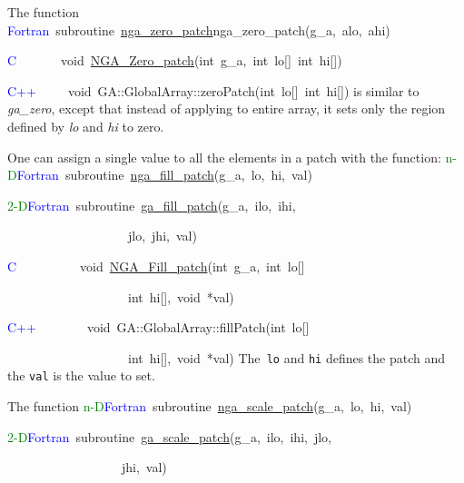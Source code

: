 The function
\textcolor{blue}{Fortran}~subroutine~\href{http://www.emsl.pnl.gov/docs/global/ga_ops.html\#ga_zero_patch}{nga\_{}zero\_{}patch}nga\_zero\_patch(g\_a,~alo,~ahi)~

\textcolor{blue}{C}~~~~~~~void~\href{http://www.emsl.pnl.gov/docs/global/c_nga_ops.html\#ga_zero_patch}{NGA\_{}Zero\_{}patch}(int~g\_a,~int~lo{[}{]}~int~hi{[}{]})~

\textcolor{blue}{C++}~~~~~void~GA::GlobalArray::zeroPatch(int~lo{[}{]}~int~hi{[}{]})
is similar to \emph{ga\_zero}, except that instead of applying to
entire array, it sets only the region defined by \emph{lo} and \emph{hi}
to zero.

One can assign a single value to all the elements in a patch with
the function:
\textcolor{green}{n-D}\textcolor{blue}{Fortran}~subroutine~\href{http://www.emsl.pnl.gov/docs/global/ga_ops.html\#ga_fill_patch}{nga\_{}fill\_{}patch}(g\_a,~lo,~hi,~val)~

\textcolor{green}{2-D}\textcolor{blue}{Fortran}~subroutine~\href{http://www.emsl.pnl.gov/docs/global/ga_ops.html\#ga_fill_patch}{ga\_{}fill\_{}patch}(g\_a,~ilo,~ihi,~

~~~~~~~~~~~~~~~~~~~jlo,~jhi,~val)~

\textcolor{blue}{C}~~~~~~~~~~void~\href{http://www.emsl.pnl.gov/docs/global/c_nga_ops.html\#ga_fill_patch}{NGA\_{}Fill\_{}patch}(int~g\_a,~int~lo{[}{]}~

~~~~~~~~~~~~~~~~~~~int~hi{[}{]},~void~{*}val)~

\textcolor{blue}{C++}~~~~~~~~void~GA::GlobalArray::fillPatch(int~lo{[}{]}~

~~~~~~~~~~~~~~~~~~~int~hi{[}{]},~void~{*}val)
The\texttt{ lo} and \texttt{hi} defines the patch and the \texttt{val}
is the value to set.

The function
\textcolor{green}{n-D}\textcolor{blue}{Fortran}~subroutine~\href{http://www.emsl.pnl.gov/docs/global/ga_ops.html\#ga_scale_patch}{nga\_{}scale\_{}patch}(g\_a,~lo,~hi,~val)~

\textcolor{green}{2-D}\textcolor{blue}{Fortran}~subroutine~\href{http://www.emsl.pnl.gov/docs/global/ga_ops.html\#ga_scale_patch}{ga\_{}scale\_{}patch}(g\_a,~ilo,~ihi,~jlo,~

~~~~~~~~~~~~~~~~~~jhi,~val)~

